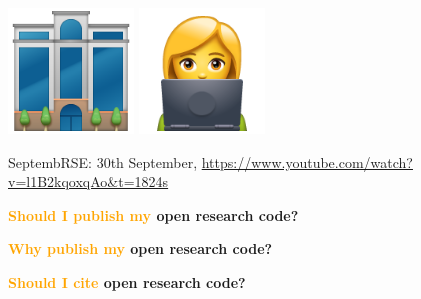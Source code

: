 \documentclass{beamer}
\begin{document}
\begin{frame}
    \begin{center}
    \includegraphics[width=0.25\textwidth]{static/office-building.png}\hspace{20pt}
    \pause
    \includegraphics[width=0.25\textwidth]{static/woman-technologist.png}
    \end{center}
\end{frame}

\begin{frame}
    \begin{center}
    \end{center}

    \centering
    \tiny{SeptembRSE: 30th September, \url{https://www.youtube.com/watch?v=l1B2kqoxqAo&t=1824s}}
\end{frame}

\begin{frame}
    \centering
    \Large{\textbf{\textcolor{orange}{Should I publish my} open research code?}}
    \vspace{1cm}
    \pause

    \Large{\textbf{\textcolor{orange}{Why publish my} open research code?}}
    \vspace{1cm}
    \pause

    \Large{\textbf{\textcolor{orange}{Should I cite} open research code?}}
\end{frame}
\end{document}
